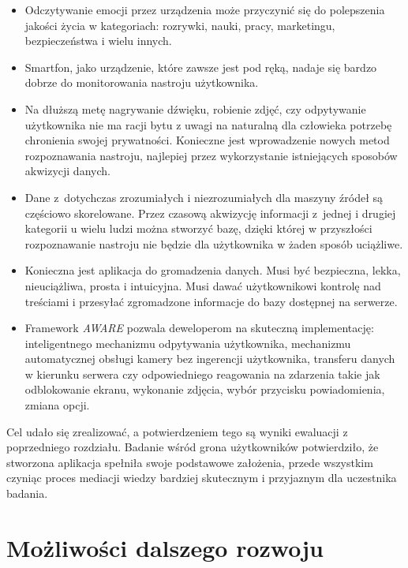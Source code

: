 \begin{itemize}
	\item Odczytywanie emocji przez urządzenia może przyczynić się do polepszenia jakości życia w kategoriach: rozrywki, nauki, pracy, marketingu, bezpieczeństwa i wielu innych.
	
	\item Smartfon, jako urządzenie, które zawsze jest pod ręką, nadaje się bardzo dobrze do monitorowania nastroju użytkownika.
	
	\item Na dłuższą metę nagrywanie dźwięku, robienie zdjęć, czy odpytywanie użytkownika nie ma racji bytu z uwagi na naturalną dla człowieka potrzebę chronienia swojej prywatności. Konieczne jest wprowadzenie nowych metod rozpoznawania nastroju, najlepiej przez wykorzystanie istniejących sposobów akwizycji danych.
	
	\item Dane z~dotychczas zrozumiałych i niezrozumiałych dla maszyny źródeł są częściowo skorelowane. Przez czasową akwizycję informacji z~jednej i drugiej kategorii u wielu ludzi można stworzyć bazę, dzięki której w przyszłości rozpoznawanie nastroju nie będzie dla użytkownika w żaden sposób uciążliwe.
	
	\item Konieczna jest aplikacja do gromadzenia danych. Musi być bezpieczna, lekka, nieuciążliwa, prosta i intuicyjna. Musi dawać użytkownikowi kontrolę nad treściami i przesyłać zgromadzone informacje do bazy dostępnej na serwerze.
	
	\item Framework \textit{AWARE} pozwala deweloperom na skuteczną implementację: inteligentnego mechanizmu odpytywania użytkownika, mechanizmu automatycznej obsługi kamery bez ingerencji użytkownika, transferu danych w kierunku serwera czy odpowiedniego reagowania na zdarzenia takie jak odblokowanie ekranu, wykonanie zdjęcia, wybór przycisku powiadomienia, zmiana opcji.
\end{itemize}

Cel udało się zrealizować, a potwierdzeniem tego są wyniki ewaluacji z poprzedniego rozdziału. Badanie wśród grona użytkowników potwierdziło, że stworzona aplikacja spełniła swoje podstawowe założenia, przede wszystkim czyniąc proces mediacji wiedzy bardziej skutecznym i przyjaznym dla uczestnika badania.


\section{Możliwości dalszego rozwoju}
\label{sec:mozwliwosciDalszegoRozwoju}

